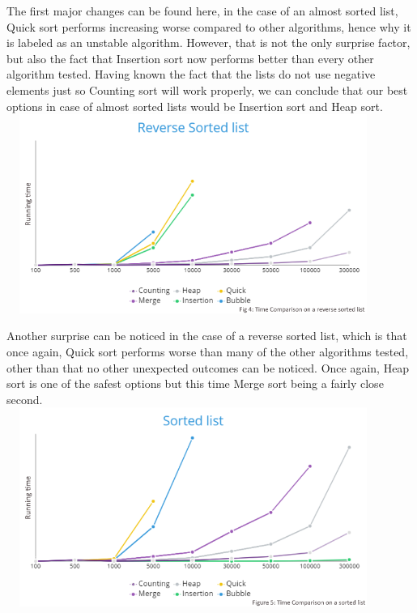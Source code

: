 \documentclass{article}
\begin{document}
\begin{center}
The first major changes can be found here, in the case of an almost sorted list, Quick sort performs increasing worse compared to other algorithms, hence why it is labeled as an unstable algorithm. However, that is not the only surprise factor, but also the fact that Insertion sort now performs better than every other algorithm tested. Having known the fact that the lists do not use negative elements just so Counting sort will work properly, we can conclude that our best options in case of almost sorted lists would be Insertion sort and Heap sort.
\smallbreak
\includegraphics[width=12.2cm, height=6.5cm]{Pics/Reverse Sorted list_.png}


Another surprise can be noticed in the case of a reverse sorted list, which is that once again, Quick sort performs worse than many of the other algorithms tested, other than that no other unexpected outcomes can be noticed. Once again, Heap sort is one of the safest options but this time Merge sort being a fairly close second.
\includegraphics[width=12.2cm, height=6.5cm]{Pics/Sorted list.png}


\end{center}
\end{document}
